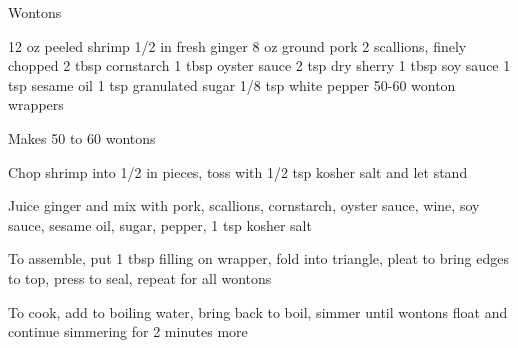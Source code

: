 \begin{denserecipe}{Wontons}{}
\begin{ingredients}
12 oz peeled shrimp
1/2 in fresh ginger
8 oz ground pork
2 scallions, finely chopped
2 tbsp cornstarch
1 tbsp oyster sauce
2 tsp dry sherry
1 tbsp soy sauce
1 tsp sesame oil
1 tsp granulated sugar
1/8 tsp white pepper
50-60 wonton wrappers
\end{ingredients}
\nextcolumn
Makes 50 to 60 wontons
\begin{steps}
\item Chop shrimp into 1/2 in pieces, toss with 1/2 tsp kosher salt and let stand
\item Juice ginger and mix with pork, scallions, cornstarch, oyster sauce, wine, soy sauce, sesame oil, sugar, pepper, 1 tsp kosher salt
\item To assemble, put 1 tbsp filling on wrapper, fold into triangle, pleat to bring edges to top, press to seal, repeat for all wontons
\item To cook, add to boiling water, bring back to boil, simmer until wontons float and continue simmering for 2 minutes more
\end{steps}
\end{denserecipe}